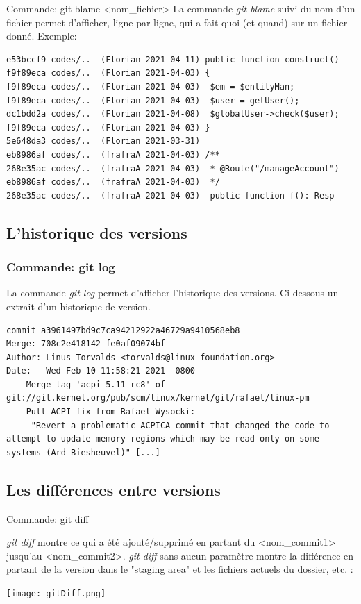 \documentclass{beamer}
\begin{document}
\begin{frame}[fragile]{Commande: git blame <nom\_fichier>}
La commande \textit{git blame} suivi du nom d'un fichier permet d'afficher, ligne par ligne, qui a fait quoi (et quand) sur un fichier donné. Exemple:
\begin{mdframed}[style=Bash]
\begin{lstlisting}[style=Bash, caption={Exemple de git blame}]
e53bccf9 codes/..  (Florian 2021-04-11) public function construct()
f9f89eca codes/..  (Florian 2021-04-03) {
f9f89eca codes/..  (Florian 2021-04-03)  $em = $entityMan;
f9f89eca codes/..  (Florian 2021-04-03)  $user = getUser();
dc1bdd2a codes/..  (Florian 2021-04-08)  $globalUser->check($user);
f9f89eca codes/..  (Florian 2021-04-03) }
5e648da3 codes/..  (Florian 2021-03-31) 
eb8986af codes/..  (frafraA 2021-04-03) /**
268e35ac codes/..  (frafraA 2021-04-03)  * @Route("/manageAccount")
eb8986af codes/..  (frafraA 2021-04-03)  */
268e35ac codes/..  (frafraA 2021-04-03)  public function f(): Resp
\end{lstlisting}
\end{mdframed}
\end{frame}

\subsection{L'historique des versions}
\begin{frame}[fragile]
\frametitle{Commande: git log}

La commande \textit{git log} permet d'afficher l'historique des versions. Ci-dessous un extrait d'un historique de version.
\begin{mdframed}[style=Bash]
    \begin{lstlisting}[style=Bash, caption={Exemple de bon message de commit}]
commit a3961497bd9c7ca94212922a46729a9410568eb8
Merge: 708c2e418142 fe0af09074bf
Author: Linus Torvalds <torvalds@linux-foundation.org>
Date:   Wed Feb 10 11:58:21 2021 -0800
    Merge tag 'acpi-5.11-rc8' of git://git.kernel.org/pub/scm/linux/kernel/git/rafael/linux-pm
    Pull ACPI fix from Rafael Wysocki:
     "Revert a problematic ACPICA commit that changed the code to attempt to update memory regions which may be read-only on some systems (Ard Biesheuvel)" [...]
    \end{lstlisting}
\end{mdframed}
\end{frame}

\subsection{Les différences entre versions}
\begin{frame}{Commande: git diff}

\textit{git diff} montre ce qui a été ajouté/supprimé en partant du <nom\_commit1> jusqu'au <nom\_commit2>. \textit{git diff} sans aucun paramètre montre la différence en partant de la version dans le "staging area" et les fichiers actuels du dossier, etc. : 
\begin{center}
	\texttt{[image: gitDiff.png]}
\end{center}
\end{frame}
\end{document}
